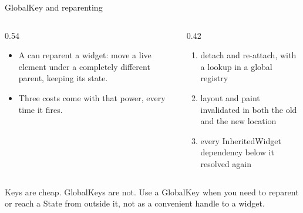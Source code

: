 \documentclass[10pt,aspectratio=169,t]{beamer}
\begin{document}
\begin{frame}[eyebrow=Rendering]{GlobalKey and reparenting}
  \begin{columns}[T]
    \begin{column}{0.54\textwidth}
      \begin{itemize}
        \item A  can reparent a widget: move a live element under a completely different parent, keeping its state.
        \item Three costs come with that power, every time it fires.
      \end{itemize}
    \end{column}
    \begin{column}{0.42\textwidth}
      \begin{enumerate}
        \item detach and re-attach, with a lookup in a global registry
        \item layout and paint invalidated in both the old and the new location
        \item every InheritedWidget dependency below it resolved again
      \end{enumerate}
    \end{column}
  \end{columns}
  \begin{takeaway}{Keys are cheap. GlobalKeys are not.}
    Use a GlobalKey when you need to reparent or reach a State from outside it, not as a convenient handle to a widget.
  \end{takeaway}
\end{frame}
\end{document}
